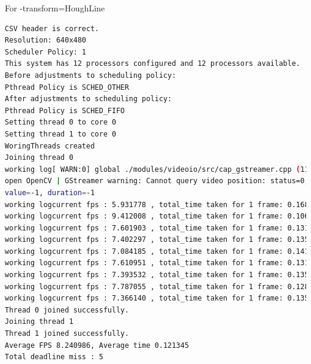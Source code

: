 \documentclass[a4paper,11pt]{article}%
\newenvironment{qanda}{\setlength{\parindent}{0pt}}{\bigskip}
\begin{document}
\begin{qanda}
\begin{enumerate}
\begin{enumerate}
\begin{itemize}
					            For -transform=HoughLine
					            \begin{lstlisting}[language=sh]
CSV header is correct.
Resolution: 640x480
Scheduler Policy: 1
This system has 12 processors configured and 12 processors available.
Before adjustments to scheduling policy:
Pthread Policy is SCHED_OTHER
After adjustments to scheduling policy:
Pthread Policy is SCHED_FIFO
Setting thread 0 to core 0
Setting thread 1 to core 0
WoringThreads created 
Joining thread 0
working log[ WARN:0] global ./modules/videoio/src/cap_gstreamer.cpp (1100) 
open OpenCV | GStreamer warning: Cannot query video position: status=0, 
value=-1, duration=-1
working logcurrent fps : 5.931778 , total_time taken for 1 frame: 0.168584 
working logcurrent fps : 9.412008 , total_time taken for 1 frame: 0.106247 
working logcurrent fps : 7.601903 , total_time taken for 1 frame: 0.131546 
working logcurrent fps : 7.402297 , total_time taken for 1 frame: 0.135093 
working logcurrent fps : 7.084185 , total_time taken for 1 frame: 0.141160 
working logcurrent fps : 7.610951 , total_time taken for 1 frame: 0.131390 
working logcurrent fps : 7.393532 , total_time taken for 1 frame: 0.135253 
working logcurrent fps : 7.787055 , total_time taken for 1 frame: 0.128418 
working logcurrent fps : 7.366140 , total_time taken for 1 frame: 0.135756 
Thread 0 joined successfully.
Joining thread 1
Thread 1 joined successfully.
Average FPS 8.240986, Average time 0.121345 
Total deadline miss : 5

	\end{lstlisting}



\end{itemize}
\end{enumerate}
\end{enumerate}
\end{qanda}
\end{document}
